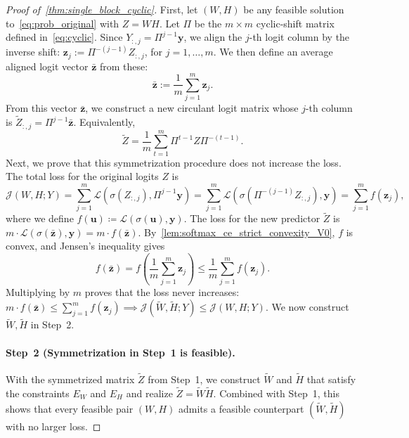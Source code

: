 \documentclass[11pt]{article}
\begin{document}
\begin{proof}[Proof of~\cref{thm:single_block_cyclic}]
First, let \((W,H)\) be any feasible solution to~\cref{eq:prob_original} with \(Z = WH\). Let \(\Pi\) be the \(m \times m\) cyclic-shift matrix defined in~\cref{eq:cyclic}. Since \(Y_{:,j}=\Pi^{j-1}\boldsymbol{y}\), we align the \(j\)-th logit column by the inverse shift: \( \boldsymbol z_j := \Pi^{-(j-1)} Z_{:,j}\), for \(j=1,\ldots,m\).
We then define an average aligned logit vector \(\bar{\boldsymbol z}\) from these:
\[ \bar{\boldsymbol z} := \frac{1}{m}\sum_{j=1}^{m} \boldsymbol{z}_j. \]
From this vector \(\bar{\boldsymbol z}\), we construct a new circulant logit matrix whose \(j\)-th column is \(\widetilde Z_{:,j}=\Pi^{j-1}\bar{\boldsymbol z}\). Equivalently, 
\[
\widetilde Z =\frac{1}{m}\sum_{t=1}^{m} \Pi^{t-1} Z \Pi^{-(t-1)}.
\]
Next, we prove that this symmetrization procedure does not increase the loss. The total loss for the original logits \(Z\) is
\[ \mathcal J(W,H;Y) = \sum_{j=1}^{m}\mathcal L(\sigma(Z_{:,j}), \Pi^{j-1}\boldsymbol{y}) = \sum_{j=1}^{m}\mathcal L(\sigma(\Pi^{-(j-1)}Z_{:,j}),  \boldsymbol{y}) = \sum_{j=1}^{m}f(\boldsymbol{z}_j), \]
where we define \(f(\boldsymbol u) \coloneqq \mathcal L(\sigma(\boldsymbol u), \boldsymbol{y})\). The loss for the new predictor \(\widetilde{Z}\) is \(m \cdot \mathcal L(\sigma(\bar{\boldsymbol z}),\boldsymbol{y}) = m \cdot f(\bar{\boldsymbol z})\). By~\cref{lem:softmax_ce_strict_convexity_V0}, \(f\) is convex, and Jensen's inequality gives
\begin{equation}
    \label{eq:jensen2}
f(\bar{\boldsymbol z}) = f\left(\frac{1}{m}\sum_{j=1}^{m} \boldsymbol{z}_j\right) \le \frac{1}{m}\sum_{j=1}^{m} f(\boldsymbol{z}_j). 
\end{equation}
Multiplying by \(m\) proves that the loss never increases: \(m \cdot f(\bar{\boldsymbol z}) \le \sum_{j=1}^{m}f(\boldsymbol{z}_j) \implies \mathcal J(\widetilde{W},\widetilde{H};Y) \le \mathcal J(W,H;Y)\). We now construct \( \widetilde{W}, \widetilde{H}\) in Step~2.

\paragraph{Step~2 (Symmetrization in Step~1 is feasible).}
With the symmetrized matrix $\widetilde{Z}$ from Step~1, we construct $\widetilde{W}$ and $\widetilde{H}$ that satisfy the constraints $E_W$ and $E_H$ and realize $\widetilde{Z}=\widetilde{W}\widetilde{H}$. Combined with Step~1, this shows that every feasible pair $(W,H)$ admits a feasible counterpart $(\widetilde W,\widetilde H)$ with no larger loss.


\end{proof}
\end{document}
